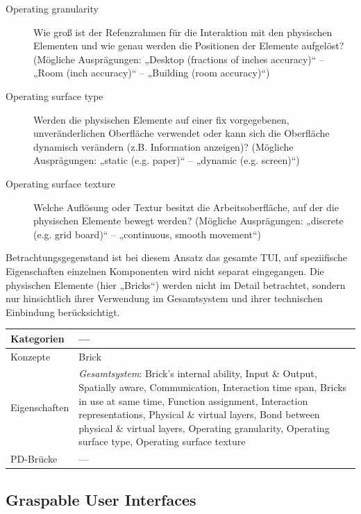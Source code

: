 \begin{description}
	\item[Operating granularity] Wie groß ist der Refenzrahmen für die Interaktion mit den physischen Elementen und wie genau werden die Positionen der Elemente aufgelöst? (Mögliche Ausprägungen: „Desktop (fractions of inches accuracy)“ -- „Room (inch accuracy)“ -- „Building (room accuracy)“)
	\item[Operating surface type] Werden die physischen Elemente auf einer fix vorgegebenen, unveränderlichen Oberfläche verwendet oder kann sich die Oberfläche dynamisch verändern (z.B. Information anzeigen)? (Mögliche Ausprägungen: „static (e.g. paper)“ -- „dynamic (e.g. screen)“)
	\item[Operating surface texture] Welche Auflösung oder Textur besitzt die Arbeitsoberfläche, auf der die physischen Elemente bewegt werden? (Mögliche Ausprägungen: „discrete (e.g. grid board)“ -- „continuous, smooth movement“)
\end{description}

Betrachtungsgegenstand ist bei diesem Ansatz das gesamte \gls{TUI}, auf speziifische Eigenschaften einzelnen Komponenten wird nicht separat eingegangen. Die physischen Elemente (hier „Bricks“) werden nicht im Detail betrachtet, sondern nur hinsichtlich ihrer Verwendung im Gesamtsystem und ihrer technischen Einbindung berücksichtigt.
\\[1em]
\begin{tabular}{| p{3cm} | p{10cm} |}
  \hline
  Kategorien & --- \\ \hline
  Konzepte & Brick \\ \hline
  Eigenschaften & \emph{Gesamtsystem}: Brick's internal ability, Input \& Output, Spatially aware, Communication, Interaction time span, Bricks in use at same time, Function assignment, Interaction representations, Physical \& virtual layers, Bond between physical \& virtual layers, Operating granularity, Operating surface type, Operating surface texture \\ \hline
  PD-Brücke & --- \\ \hline
\end{tabular} 


\subsection{Graspable User Interfaces} %
\label{sub:graspable_user_interfaces}

